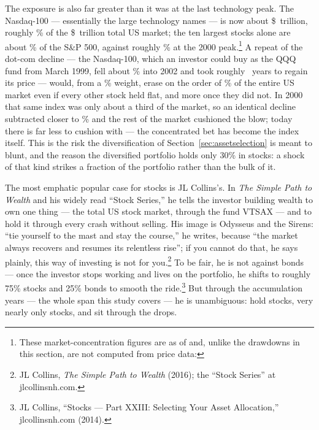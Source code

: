 \documentclass[11pt]{article}
\begin{document}
The exposure is also far greater than it was at the last technology peak. The Nasdaq-100 --- essentially
the large technology names --- is now about \$\NdxMktcap\ trillion, roughly \NdxShareNow\% of the
\$\UsMktcap\ trillion total US market; the ten largest stocks alone are about \TopTenNow\% of the S\&P
500, against roughly \TopTenThen\% at the 2000 peak.\footnote{These market-concentration figures are as
of \ConcAsOf{} and, unlike the drawdowns in this section, are not computed from price data: \ConcSources}
A repeat of the dot-com decline --- the Nasdaq-100,
which an investor could buy as the QQQ fund from March 1999, fell about \NasdaqDotcomDecline\% into 2002
and took roughly \NasdaqDotcomRecoverYears\ years to regain its price --- would, from a \NdxShareNow\%
weight, erase on the order of \EraseNow\% of the
entire US market even if every other stock held flat, and more once they did not. In 2000 that same
index was only about a third of the market, so an identical decline subtracted closer to \EraseThen\%
and the rest of the market cushioned the blow; today there is far less to cushion with --- the
concentrated bet has become the index itself. This is the risk the diversification of
Section~\ref{sec:assetselection} is meant to blunt, and the reason the diversified portfolio holds only
30\% in stocks: a shock of that kind strikes a fraction of the portfolio rather than the bulk of it.

The most emphatic popular case for stocks is JL Collins's. In \emph{The Simple Path to Wealth} and his
widely read ``Stock Series,'' he tells the investor building wealth to own one thing --- the total US
stock market, through the fund VTSAX --- and to hold it through every crash without selling. His image
is Odysseus and the Sirens: ``tie yourself to the mast and stay the course,'' he writes, because ``the
market always recovers and resumes its relentless rise''; if you cannot do that, he says plainly, this
way of investing is not for you.\footnote{JL Collins, \emph{The Simple Path to Wealth} (2016); the
``Stock Series'' at jlcollinsnh.com.} To be fair, he is not against bonds --- once the investor stops
working and lives on the portfolio, he shifts to roughly 75\% stocks and 25\% bonds to smooth the
ride.\footnote{JL Collins, ``Stocks --- Part XXIII: Selecting Your Asset Allocation,'' jlcollinsnh.com
(2014).} But through the accumulation years --- the whole span this study covers --- he is unambiguous:
hold stocks, very nearly only stocks, and sit through the drops.
\end{document}
